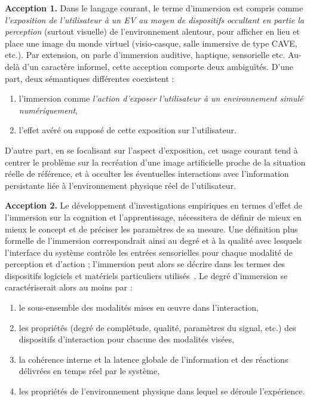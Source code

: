 	\begin{displayquote}
	    \textbf{Acception 1.} Dans le langage courant, le terme d'immersion est compris comme \emph{l'exposition de l'utilisateur à un EV au moyen de dispositifs occultant en partie la perception} (surtout visuelle) de l'environnement alentour, pour afficher en lieu et place une image du monde virtuel (visio-casque, salle immersive de type CAVE, etc.). Par extension, on parle d'immersion auditive, haptique, sensorielle etc. Au-delà d'un caractère informel, cette acception comporte deux ambiguïtés. D'une part, deux sémantiques différentes coexistent :
	    \begin{enumerate}
	        \item l'immersion comme \emph{l'action d'exposer l'utilisateur à un environnement simulé numériquement},
	        \item l'effet avéré ou supposé de cette exposition sur l'utilisateur.
	    \end{enumerate}
	    
	    D'autre part, en se focalisant sur l'aspect d'exposition, cet usage courant tend à centrer le problème sur la recréation d'une image artificielle proche de la situation réelle de référence, et à occulter les éventuelles interactions avec l'information persistante liée à l'environnement physique réel de l'utilisateur.
	    
	    \textbf{Acception 2.} Le développement d'investigations empiriques en termes d'effet de l'immersion sur la cognition et l'apprentissage, nécessitera de définir de mieux en mieux le concept et de préciser les paramètres de sa mesure. Une définition plus formelle de l'immersion correspondrait ainsi au degré et à la qualité avec lesquels l'interface du système contrôle les entrées sensorielles pour chaque modalité de perception et d'action ; l'immersion peut alors se décrire dans les termes des dispositifs logiciels et matériels particuliers utilisés~\cite{burkhardt1999conception}. Le degré d'immersion se caractériserait alors au moins par :
	    \begin{enumerate}
	        \item le sous-ensemble des modalités mises en \oe{}uvre dans l'interaction,
	        \item les propriétés (degré de complétude, qualité, paramètres du signal, etc.) des dispositifs d'interaction pour chacune des modalités visées,
	        \item la cohérence interne et la latence globale de l'information et des réactions délivrées en temps réel par le système,
	        \item les propriétés de l'environnement physique dans lequel se déroule l'expérience.
	    \end{enumerate}
	    

\end{displayquote}
